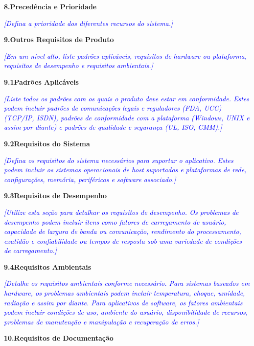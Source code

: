 \documentclass[a4paper]{article}
\begin{document}
\hypertarget{h0vdnybw53fh}{}\textbf{8.Preced\^encia e Prioridade}

\textit{\textcolor{blue}{[Defina a prioridade dos diferentes recursos do sistema.]}}

\hypertarget{n9bnzr265250}{}\textbf{9.Outros Requisitos de Produto}

\textit{\textcolor{blue}{[Em um n\'ivel alto, liste padr\~oes aplic\'aveis, requisitos de hardware ou plataforma,
requisitos de desempenho e requisitos ambientais.]}}

\hypertarget{stor88pq7jbs}{}\textbf{9.1Padr\~oes Aplic\'aveis}

\textit{\textcolor{blue}{[Liste todos os padr\~oes com os quais o produto deve estar em conformidade. Estes podem
incluir padr\~oes de comunica\c{c}\~oes legais e reguladores (FDA, UCC) (TCP/IP, ISDN), padr\~oes de conformidade com a
plataforma (Windows, UNIX e assim por diante) e padr\~oes de qualidade e seguran\c{c}a (UL, ISO, CMM).]}}

\hypertarget{pxn3hvmiu1qj}{}\textbf{9.2Requisitos do Sistema}

\textit{\textcolor{blue}{[Defina os requisitos do sistema necess\'arios para suportar o aplicativo. Estes podem incluir
os sistemas operacionais de host suportados e plataformas de rede, configura\c{c}\~oes, mem\'oria, perif\'ericos e
software associado.]}}

\hypertarget{3up1a4xsydnl}{}\textbf{9.3Requisitos de Desempenho}

\textit{\textcolor{blue}{[Utilize esta se\c{c}\~ao para detalhar os requisitos de desempenho. Os problemas de desempenho
podem incluir itens como fatores de carregamento de usu\'ario, capacidade de largura de banda ou comunica\c{c}\~ao,
rendimento do processamento, exatid\~ao e confiabilidade ou tempos de resposta sob uma variedade de condi\c{c}\~oes de
carregamento.]}}

\hypertarget{jfexnf1qeamo}{}\textbf{9.4Requisitos Ambientais}

\textit{\textcolor{blue}{[Detalhe os requisitos ambientais conforme necess\'ario. Para sistemas baseados em hardware, os
problemas ambientais podem incluir temperatura, choque, umidade, radia\c{c}\~ao e assim por diante. Para aplicativos de
software, os fatores ambientais podem incluir condi\c{c}\~oes de uso, ambiente do usu\'ario, disponibilidade de
recursos, problemas de manuten\c{c}\~ao e manipula\c{c}\~ao e recupera\c{c}\~ao de erros.]}}

\hypertarget{3x4l0fj0wcq9}{}\textbf{10.Requisitos de Documenta\c{c}\~ao}
\end{document}
